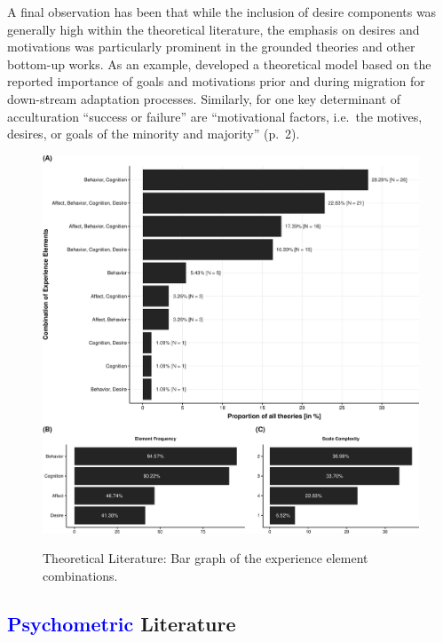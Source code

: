 A final observation has been that while the inclusion of desire
components was generally high within the theoretical literature, the
emphasis on desires and motivations was particularly prominent in the
grounded theories and other bottom-up works. As an example,
\citet[][]{Kim2019} developed a theoretical model based on the reported
importance of goals and motivations prior and during migration for
down-stream adaptation processes. Similarly, for
\citet[][]{Mchitarjan2015} one key determinant of acculturation
``success or failure'' are ``motivational factors, i.e.~the motives,
desires, or goals of the minority and majority'' (p.~2). \color{black}

\begin{figure}[h]
\centering
\caption{Theoretical Literature: Bar graph of the experience element combinations.}
\includegraphics[width=\textwidth]{Figures/TheoriesFreq-1}
\label{fig:ElementsTheories}
\end{figure}



\subsection{\textcolor{blue}{Psychometric} Literature}

